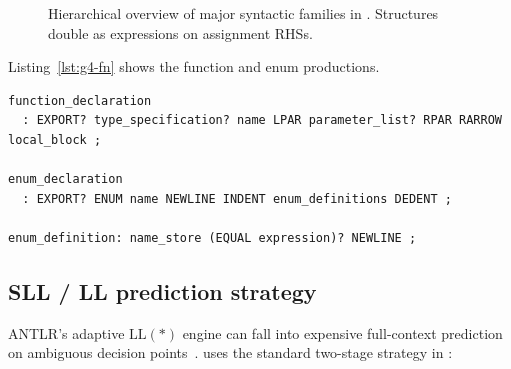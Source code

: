 \documentclass[11pt,a4paper]{article}
\begin{document}
\begin{figure}[t]
\centering
{}
\caption{Hierarchical overview of major syntactic families in
. Structures double as expressions on assignment RHSs.}
\label{fig:syntax-overview}
\end{figure}

Listing~\ref{lst:g4-fn} shows the function and enum productions.

\begin{lstlisting}[style=pine,caption={Parser productions for functions and enums (from \texttt{PinescriptParser.g4}).},label={lst:g4-fn},language={}]
function_declaration
  : EXPORT? type_specification? name LPAR parameter_list? RPAR RARROW local_block ;

enum_declaration
  : EXPORT? ENUM name NEWLINE INDENT enum_definitions DEDENT ;

enum_definition: name_store (EQUAL expression)? NEWLINE ;
\end{lstlisting}

\subsection{SLL / LL prediction strategy}
\label{sec:sll}

ANTLR's adaptive \(\mathrm{LL}(*)\) engine can fall into expensive full-context
prediction on ambiguous decision points~\citep{parr2011allstar,parr2013antlr}.
\pyne{} uses the standard two-stage strategy in :
\end{document}
